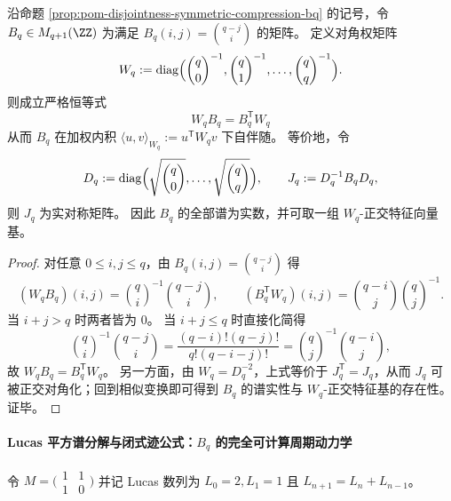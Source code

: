 
\begin{proposition}\label{prop:pom-bq-weighted-selfadjoint-binomial}
沿命题 \ref{prop:pom-disjointness-symmetric-compression-bq} 的记号，令 \(B_q\in M_{q+1}(\ZZ)\) 为满足 \(B_q(i,j)=\binom{q-j}{i}\) 的矩阵。
定义对角权矩阵
\[
W_q:=\mathrm{diag}\Bigl(\binom{q}{0}^{-1},\binom{q}{1}^{-1},\dots,\binom{q}{q}^{-1}\Bigr).
\]
则成立严格恒等式
\[
\boxed{\;W_qB_q=B_q^{\mathsf T}W_q\;}
\]
从而 \(B_q\) 在加权内积 \(\langle u,v\rangle_{W_q}:=u^{\mathsf T}W_qv\) 下自伴随。
等价地，令
\[
D_q:=\mathrm{diag}\Bigl(\sqrt{\binom{q}{0}},\dots,\sqrt{\binom{q}{q}}\Bigr),
\qquad
J_q:=D_q^{-1}B_qD_q,
\]
则 \(J_q\) 为实对称矩阵。
因此 \(B_q\) 的全部谱为实数，并可取一组 \(W_q\)-正交特征向量基。
\end{proposition}
\begin{proof}
对任意 \(0\le i,j\le q\)，由 \(B_q(i,j)=\binom{q-j}{i}\) 得
\[
(W_qB_q)(i,j)=\binom{q}{i}^{-1}\binom{q-j}{i},
\qquad
(B_q^{\mathsf T}W_q)(i,j)=\binom{q-i}{j}\binom{q}{j}^{-1}.
\]
当 \(i+j>q\) 时两者皆为 \(0\)。
当 \(i+j\le q\) 时直接化简得
\[
\binom{q}{i}^{-1}\binom{q-j}{i}
=\frac{(q-i)!(q-j)!}{q!(q-i-j)!}
=\binom{q}{j}^{-1}\binom{q-i}{j},
\]
故 \(W_qB_q=B_q^{\mathsf T}W_q\)。
另一方面，由 \(W_q=D_q^{-2}\)，上式等价于 \(J_q^{\mathsf T}=J_q\)，从而 \(J_q\) 可被正交对角化；回到相似变换即可得到 \(B_q\) 的谱实性与 \(W_q\)-正交特征基的存在性。证毕。
\end{proof}


\paragraph{Lucas 平方谱分解与闭式迹公式：\texorpdfstring{$B_q$}{Bq} 的完全可计算周期动力学}
令
\(
M=\bigl(\begin{smallmatrix}1&1\\[2pt]1&0\end{smallmatrix}\bigr)
\)
并记 Lucas 数列为 \(L_0=2,L_1=1\) 且 \(L_{n+1}=L_n+L_{n-1}\)。

